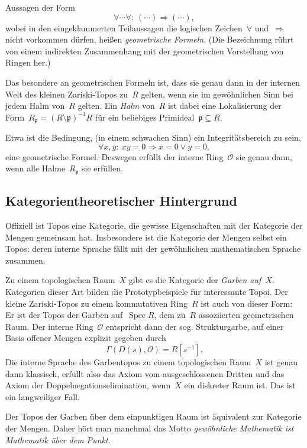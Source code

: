 \documentclass[a4paper,ngerman,12pt]{scrartcl}
\theoremstyle{definition}
\theoremstyle{plain}
\theoremstyle{remark}
\newcommand{\pp}{\mathfrak{p}}
\renewcommand{\O}{\mathcal{O}}
\DeclareMathOperator{\Spec}{Spec}
\renewcommand{\_}{\mathpunct{.}\,}
\newcommand{\?}{\,{:}\,}
\begin{document}
Aussagen der Form
\[ \forall \cdots \forall{:}\ (\cdots) \Rightarrow (\cdots), \]
wobei in den eingeklammerten Teilaussagen die logischen Zeichen~$\forall$
und~$\Rightarrow$ nicht vorkommen dürfen, heißen \emph{geometrische Formeln}.
(Die Bezeichnung rührt von einem indirekten Zusammenhang mit der geometrischen
Vorstellung von Ringen her.)

Das besondere an geometrischen Formeln ist, dass sie genau dann in der internen
Welt des kleinen Zariski-Topos zu~$R$ gelten, wenn sie im gewöhnlichen Sinn bei
jedem Halm von~$R$ gelten. Ein \emph{Halm} von~$R$ ist dabei eine Lokalisierung
der Form~$R_\pp = (R \setminus \pp)^{-1}R$ für ein beliebiges Primideal~$\pp
\subseteq R$.

Etwa ist die Bedingung, (in einem schwachen Sinn) ein Integritätsbereich zu
sein,
\[ \forall x,y{:}\ xy = 0 \Rightarrow x = 0 \vee y = 0, \]
eine geometrische Formel. Deswegen erfüllt der interne Ring~$\O$ sie genau
dann, wenn alle Halme~$R_\pp$ sie erfüllen.



\subsection*{Kategorientheoretischer Hintergrund}

Offiziell ist Topos eine Kategorie, die gewisse Eigenschaften mit der
Kategorie der Mengen gemeinsam hat. Insbesondere ist die Kategorie der Mengen
selbst ein Topos; deren interne Sprache fällt mit der gewöhnlichen
mathematischen Sprache zusammen.

Zu einem topologischen Raum~$X$ gibt es die Kategorie der \emph{Garben
auf~$X$}. Kategorien dieser Art bilden die Prototypbeispiele für interessante
Topoi. Der kleine Zariski-Topos zu einem kommutativen Ring~$R$ ist auch von
dieser Form: Er ist der Topos der Garben auf~$\Spec R$, dem zu~$R$ assoziierten
geometrischen Raum. Der interne Ring~$\O$ entspricht dann der sog.
Strukturgarbe, auf einer Basis offener Mengen explizit gegeben durch
\[ \Gamma(D(s), \O) = R[s^{-1}]. \]
Die interne Sprache des Garbentopos zu einem topologischen Raum~$X$ ist genau
dann klassisch, erfüllt also das Axiom vom ausgeschlossenen Dritten und das
Axiom der Doppelnegationselimination, wenn~$X$ ein diskreter Raum ist. Das ist
ein langweiliger Fall.

Der Topos der Garben über dem einpunktigen Raum ist äquivalent zur Kategorie
der Mengen. Daher hört man manchmal das Motto \emph{gewöhnliche Mathematik ist
Mathematik über dem Punkt}.
\end{document}
